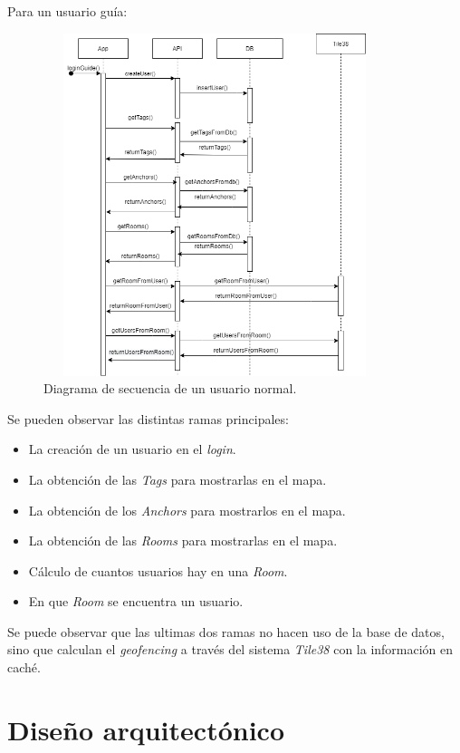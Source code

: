 Para un usuario guía: 
\FloatBarrier
\begin{figure}[h]
    \centering
    \includegraphics[width=10cm,height=10cm,keepaspectratio]{img/Guide Diagram secuencia.drawio.png}
    \caption{Diagrama de secuencia de un usuario normal.}
    \label{fig:diagram_seceunce_guide}
\end{figure}
\FloatBarrier

Se pueden observar las distintas ramas principales:
\begin{itemize}
    \item La creación de un usuario en el \textit{login}.
    \item La obtención de las \textit{Tags} para mostrarlas en el mapa.
    \item La obtención de los \textit{Anchors} para mostrarlos en el mapa.
    \item La obtención de las \textit{Rooms} para mostrarlas en el mapa.
    \item Cálculo de cuantos usuarios hay en una \textit{Room}.
    \item En que \textit{Room} se encuentra un usuario.
\end{itemize}

Se puede observar que las ultimas dos ramas no hacen uso de la base de datos, sino que calculan el \textit{geofencing} a través del sistema \textit{Tile38} con la información en caché.

\section{Diseño arquitectónico}


